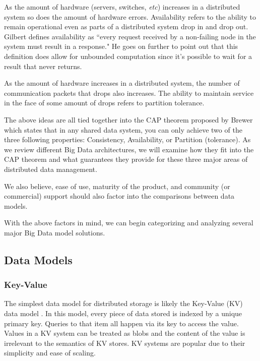 \documentclass[twocolumn]{article}
\begin{document}
As the amount of hardware (servers, switches, \textit{etc}) increases in a distributed system so does the amount of hardware errors. Availability refers to the ability to remain operational even as parts of a distributed system drop in and drop out\cite{chen_big_2014}. Gilbert\cite{gilbert2002brewer} defines availability as ``every request received by a non-failing node in the system must result in a response." He goes on further to point out that this definition does allow for unbounded computation since it's possible to wait for a result that never returns.

As the amount of hardware increases in a distributed system, the number of communication packets that drops also increases. The ability to maintain service in the face of some amount of drops refers to partition tolerance\cite{chen_big_2014}.

The above ideas are all tied together into the CAP theorem proposed by Brewer\cite{brewer2000towards} which states that in any shared data system, you can only achieve two of the three following properties: Consistency, Availability, or Partition (tolerance). As we review different Big Data architectures, we will examine how they fit into the CAP theorem and what guarantees they provide for these three major areas of distributed data management.

We also believe, ease of use, maturity of the product, and community (or commercial) support should also factor into the comparisons between data models. 

With the above factors in mind, we can begin categorizing and analyzing several major Big Data model solutions.

\subsection{Data Models}
\subsubsection{Key-Value}
The simplest data model for distributed storage is likely the Key-Value (KV) data model \cite{weber_nosql_2010}. In this model, every piece of data stored is indexed by a unique primary key. Queries to that item all happen via its key to access the value. Values in a KV system can be treated as blobs and the content of the value is irrelevant to the semantics of KV stores. KV systems are popular due to their simplicity and ease of scaling.
\end{document}
